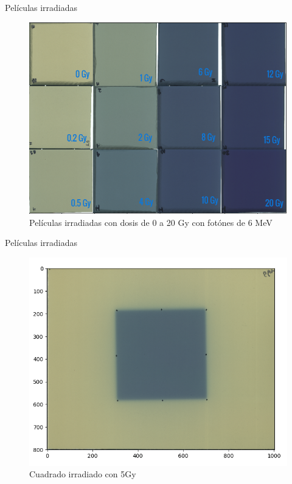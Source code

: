 \documentclass[12pt]{beamer}
\begin{document}

\begin{frame}{Películas irradiadas}
\begin{figure}
	\centering
	\includegraphics[width=0.7\linewidth]{images/peliculasIrradiadas_2.png}
	\caption{Películas irradiadas con dosis de 0 a 20 Gy con fotónes de 6 MeV}
\end{figure}

\end{frame}

\begin{frame}{Películas irradiadas}
\begin{figure}
	\centering
	\includegraphics[width=0.7\linewidth]{images/peliculaCuadrado.png}
	\caption{Cuadrado irradiado con 5Gy}
\end{figure}
\end{frame}
\end{document}
